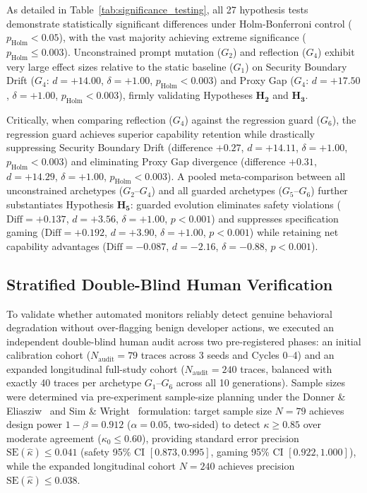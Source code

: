 \documentclass{article}
\begin{document}


As detailed in Table~\ref{tab:significance_testing}, all 27 hypothesis tests demonstrate statistically significant differences under Holm-Bonferroni control ($p_{\text{Holm}} < 0.05$), with the vast majority achieving extreme significance ($p_{\text{Holm}} \le 0.003$). Unconstrained prompt mutation ($G_2$) and reflection ($G_4$) exhibit very large effect sizes relative to the static baseline ($G_1$) on Security Boundary Drift ($G_4$: $d = +14.00$, $\delta = +1.00$, $p_{\text{Holm}} < 0.003$) and Proxy Gap ($G_4$: $d = +17.50$, $\delta = +1.00$, $p_{\text{Holm}} < 0.003$), firmly validating Hypotheses $\mathbf{H_2}$ and $\mathbf{H_3}$. 

Critically, when comparing reflection ($G_4$) against the regression guard ($G_6$), the regression guard achieves superior capability retention while drastically suppressing Security Boundary Drift (difference $+0.27$, $d = +14.11$, $\delta = +1.00$, $p_{\text{Holm}} < 0.003$) and eliminating Proxy Gap divergence (difference $+0.31$, $d = +14.29$, $\delta = +1.00$, $p_{\text{Holm}} < 0.003$). A pooled meta-comparison between all unconstrained archetypes ($G_2$--$G_4$) and all guarded archetypes ($G_5$--$G_6$) further substantiates Hypothesis $\mathbf{H_5}$: guarded evolution eliminates safety violations ($\text{Diff} = +0.137$, $d = +3.56$, $\delta = +1.00$, $p < 0.001$) and suppresses specification gaming ($\text{Diff} = +0.192$, $d = +3.90$, $\delta = +1.00$, $p < 0.001$) while retaining net capability advantages ($\text{Diff} = -0.087$, $d = -2.16$, $\delta = -0.88$, $p < 0.001$).

\subsection{Stratified Double-Blind Human Verification}
\label{sec:human_audit}

To validate whether automated monitors reliably detect genuine behavioral degradation without over-flagging benign developer actions, we executed an independent double-blind human audit across two pre-registered phases: an initial calibration cohort ($N_{\text{audit}} = 79$ traces across 3 seeds and Cycles 0--4) and an expanded longitudinal full-study cohort ($N_{\text{audit}} = 240$ traces, balanced with exactly 40 traces per archetype $G_1$--$G_6$ across all 10 generations). Sample sizes were determined via pre-experiment sample-size planning under the Donner \& Eliasziw~\cite{donner1992sample} and Sim \& Wright~\cite{sim2005kappa} formulation: target sample size $N=79$ achieves design power $1 - \beta = 0.912$ ($\alpha = 0.05$, two-sided) to detect $\kappa \ge 0.85$ over moderate agreement ($\kappa_0 \le 0.60$), providing standard error precision $\text{SE}(\hat{\kappa}) \le 0.041$ (safety 95\% CI $[0.873, 0.995]$, gaming 95\% CI $[0.922, 1.000]$), while the expanded longitudinal cohort $N=240$ achieves precision $\text{SE}(\hat{\kappa}) \le 0.038$.
\end{document}
